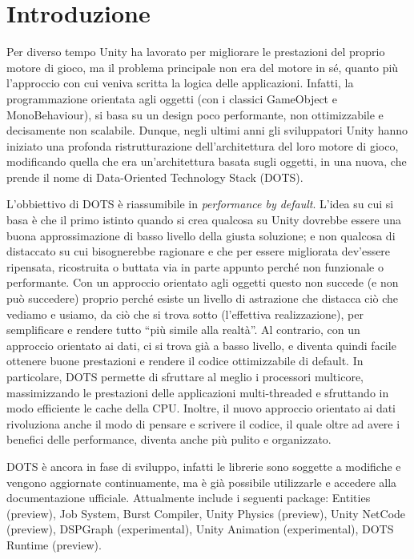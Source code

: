 \chapter*{Introduzione} %

Per diverso tempo Unity ha lavorato per migliorare le prestazioni del proprio motore di gioco, ma il problema principale non era del motore in sé, quanto più l'approccio con cui veniva scritta la logica delle applicazioni. Infatti, la programmazione orientata agli oggetti (con i classici GameObject e MonoBehaviour), si basa su un design poco performante, non ottimizzabile e decisamente non scalabile.
Dunque, negli ultimi anni gli sviluppatori Unity hanno iniziato una profonda ristrutturazione dell'architettura del loro motore di gioco, modificando quella che era un'architettura basata sugli oggetti, in una nuova, che prende il nome di Data-Oriented Technology Stack (DOTS).

L'obbiettivo di DOTS è riassumibile in \emph{performance by default}. L'idea su cui si basa è che il primo istinto quando si crea qualcosa su Unity dovrebbe essere una buona approssimazione di basso livello della giusta soluzione; e non qualcosa di distaccato su cui bisognerebbe ragionare e che per essere migliorata dev'essere ripensata, ricostruita o buttata via in parte appunto perché non funzionale o performante.
Con un approccio orientato agli oggetti questo non succede (e non può succedere) proprio perché esiste un livello di astrazione che distacca ciò che vediamo e usiamo, da ciò che si trova sotto (l'effettiva realizzazione), per semplificare e rendere tutto ``più simile alla realtà''. Al contrario, con un approccio orientato ai dati, ci si trova già a basso livello, e diventa quindi facile ottenere buone prestazioni e rendere il codice ottimizzabile di default.
In particolare, DOTS permette di sfruttare al meglio i processori multicore, massimizzando le prestazioni delle applicazioni multi-threaded e sfruttando in modo efficiente le cache della CPU. Inoltre, il nuovo approccio orientato ai dati rivoluziona anche il modo di pensare e scrivere il codice, il quale oltre ad avere i benefici delle performance, diventa anche più pulito e organizzato.

DOTS è ancora in fase di sviluppo, infatti le librerie sono soggette a modifiche e vengono aggiornate continuamente, ma è già possibile utilizzarle e accedere alla documentazione ufficiale. Attualmente include i seguenti package: Entities (preview), \Csh{} Job System, Burst Compiler, Unity Physics (preview), Unity NetCode (preview), DSPGraph (experimental), Unity Animation (experimental), DOTS Runtime (preview).


